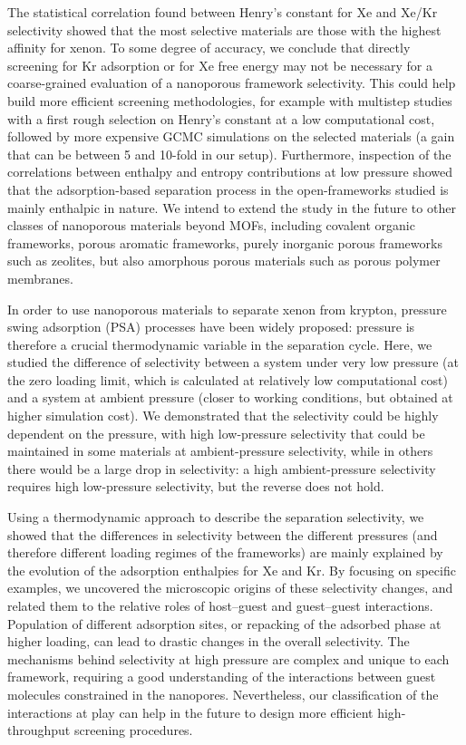 \documentclass[main]{subfiles}
\begin{document}
The statistical correlation found between Henry's constant for Xe and Xe/Kr selectivity showed that the most selective materials are those with the highest affinity for xenon. To some degree of accuracy, we conclude that directly screening for Kr adsorption or for Xe free energy may not be necessary for a coarse-grained evaluation of a nanoporous framework selectivity. This could help build more efficient screening methodologies, for example with multistep studies with a first rough selection on Henry's constant at a low computational cost, followed by more expensive GCMC simulations on the selected materials (a gain that can be between 5 and 10-fold in our setup). Furthermore, inspection of the correlations between enthalpy and entropy contributions at low pressure showed that the adsorption-based separation process in the open-frameworks studied is mainly enthalpic in nature. We intend to extend the study in the future to other classes of nanoporous materials beyond MOFs, including covalent organic frameworks, porous aromatic frameworks, purely inorganic porous frameworks such as zeolites, but also amorphous porous materials such as porous polymer membranes.

In order to use nanoporous materials to separate xenon from krypton, pressure swing adsorption (PSA) processes have been widely proposed: pressure is therefore a crucial thermodynamic variable in the separation cycle. Here, we studied the difference of selectivity between a system under very low pressure (at the zero loading limit, which is calculated at relatively low computational cost) and a system at ambient pressure (closer to working conditions, but obtained at higher simulation cost). We demonstrated that the selectivity could be highly dependent on the pressure, with high low-pressure selectivity that could be maintained in some materials at ambient-pressure selectivity, while in others there would be a large drop in selectivity: a high ambient-pressure selectivity requires high low-pressure selectivity, but the reverse does not hold.

Using a thermodynamic approach to describe the separation selectivity, we showed that the differences in selectivity between the different pressures (and therefore different loading regimes of the frameworks) are mainly explained by the evolution of the adsorption enthalpies for Xe and Kr. By focusing on specific examples, we uncovered the microscopic origins of these selectivity changes, and related them to the relative roles of host--guest and guest--guest interactions. Population of different adsorption sites, or repacking of the adsorbed phase at higher loading, can lead to drastic changes in the overall selectivity. The mechanisms behind selectivity at high pressure are complex and unique to each framework, requiring a good understanding of the interactions between guest molecules constrained in the nanopores. Nevertheless, our classification of the interactions at play can help in the future to design more efficient high-throughput screening procedures.


\OnlyInSubfile{\printglobalbibliography}
\end{document}
